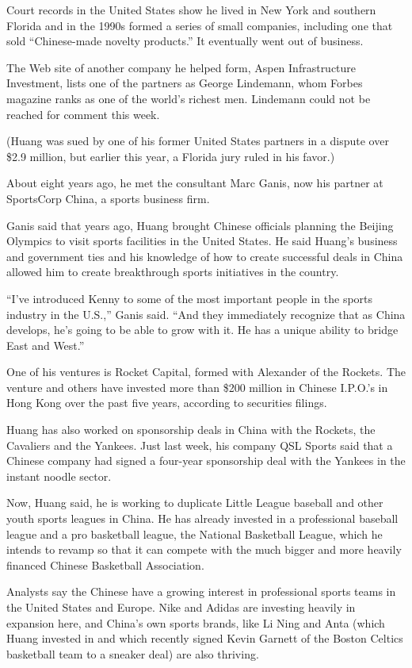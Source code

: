 ﻿\documentclass[12pt]{article}
\begin{document}
Court records in the United States show he lived in New York and southern Florida and in the 1990s
formed a series of small companies, including one that sold ``Chinese-made novelty products.'' It
eventually went out of business.

The Web site of another company he helped form, Aspen Infrastructure Investment, lists one of the
partners as George Lindemann, whom Forbes magazine ranks as one of the world's richest men.
Lindemann could not be reached for comment this week.

(Huang was sued by one of his former United States partners in a dispute over \$2.9 million, but
earlier this year, a Florida jury ruled in his favor.)

About eight years ago, he met the consultant Marc Ganis, now his partner at SportsCorp China, a
sports business firm.

Ganis said that years ago, Huang brought Chinese officials planning the Beijing Olympics to visit
sports facilities in the United States. He said Huang's business and government ties and his
knowledge of how to create successful deals in China allowed him to create breakthrough sports
initiatives in the country.

``I've introduced Kenny to some of the most important people in the sports industry in the U.S.,''
Ganis said. ``And they immediately recognize that as China develops, he's going to be able to grow
with it. He has a unique ability to bridge East and West.''

One of his ventures is Rocket Capital, formed with Alexander of the Rockets. The venture and others
have invested more than \$200 million in Chinese I.P.O.'s in Hong Kong over the past five years,
according to securities filings.

Huang has also worked on sponsorship deals in China with the Rockets, the Cavaliers and the Yankees.
Just last week, his company QSL Sports said that a Chinese company had signed a four-year
sponsorship deal with the Yankees in the instant noodle sector.

Now, Huang said, he is working to duplicate Little League baseball and other youth sports leagues in
China. He has already invested in a professional baseball league and a pro basketball league, the
National Basketball League, which he intends to revamp so that it can compete with the much bigger
and more heavily financed Chinese Basketball Association.

Analysts say the Chinese have a growing interest in professional sports teams in the United States
and Europe. Nike and Adidas are investing heavily in expansion here, and China's own sports brands,
like Li Ning and Anta (which Huang invested in and which recently signed Kevin Garnett of the Boston
Celtics basketball team to a sneaker deal) are also thriving.
\end{document}

